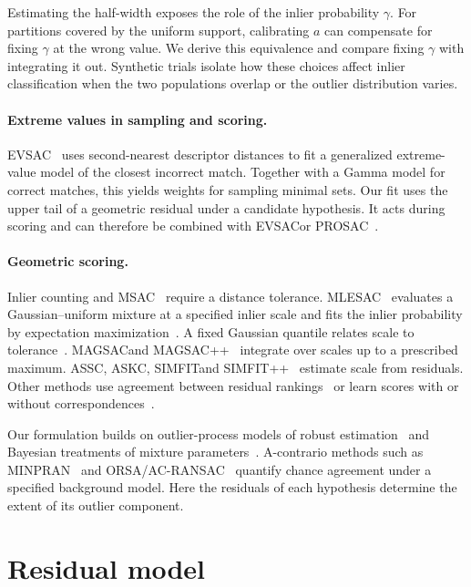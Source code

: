 \documentclass[10pt,twocolumn,letterpaper]{article}
\newcommand{\mname}[1]{\texorpdfstring{#1\xspace}{#1}}
\newcommand{\pp}{\nolinebreak[4]\hspace{-0.05em}+\nolinebreak[4]\hspace{-0.05em}+}
\newcommand{\msac}{\mname{MSAC}}
\newcommand{\mlesac}{\mname{MLESAC}}
\newcommand{\magsac}{\mname{MAGSAC}}
\newcommand{\magsacpp}{\texorpdfstring{MAGSAC\pp\xspace}{MAGSAC++}}
\newcommand{\minpran}{\mname{MINPRAN}}
\newcommand{\orsa}{\mname{ORSA}}
\newcommand{\acransac}{\mname{AC-RANSAC}}
\newcommand{\assc}{\mname{ASSC}}
\newcommand{\askc}{\mname{ASKC}}
\newcommand{\simfitpp}{\texorpdfstring{SIMFIT\pp\xspace}{SIMFIT++}}
\newcommand{\prosac}{\mname{PROSAC}}
\newcommand{\evsac}{\mname{EVSAC}}
\newcommand{\simfit}{\mname{SIMFIT}}
\begin{document}
Estimating the half-width exposes the role of the inlier probability
$\gamma$. For partitions covered by the uniform support, calibrating
$a$ can compensate for fixing $\gamma$ at the wrong value. We derive
this equivalence and compare fixing $\gamma$ with integrating it out.
Synthetic trials isolate how these choices affect inlier classification
when the two populations overlap or the outlier distribution varies.

\paragraph{Extreme values in sampling and scoring.}
\evsac~\cite{Fragoso2013evsac} uses second-nearest descriptor distances
to fit a generalized extreme-value model of the closest incorrect match.
Together with a Gamma model for correct matches, this yields weights
for sampling minimal sets. Our fit uses the upper tail of a geometric
residual under a candidate hypothesis. It acts during scoring and can
therefore be combined with \evsac or \prosac~\cite{ChumMatas2005}.

\paragraph{Geometric scoring.}
Inlier counting and \msac~\cite{Torr1998} require a distance tolerance.
\mlesac~\cite{Torr2000} evaluates a Gaussian--uniform mixture at a
specified inlier scale and fits the inlier probability by expectation
maximization~\cite{Dempster1977}. A fixed Gaussian quantile relates
scale to tolerance~\cite{Shekhovtsov2025}. \magsac and
\magsacpp~\cite{Barath2019,Barath2020} integrate over scales up to a
prescribed maximum. \assc, \askc, \simfit and
\simfitpp~\cite{Wang2004,Wang2010,Heinrich2013,Edstedt2025} estimate
scale from residuals. Other methods use agreement between residual
rankings~\cite{Raguram2011} or learn scores with or without
correspondences~\cite{Barath2022,BarrosoLaguna2023}.

Our formulation builds on outlier-process models of robust
estimation~\cite{BlackRangarajan1996} and Bayesian treatments of mixture
parameters~\cite{Torr2002,Pritts2026}. A-contrario methods such as
\minpran~\cite{Stewart1995} and \orsa/\acransac~\cite{Moisan2004,Moisan2012,Moulon2012}
quantify chance agreement under a specified background model. Here the
residuals of each hypothesis determine the extent of its outlier component.

\section{Residual model}
\label{sec:method}
\end{document}
